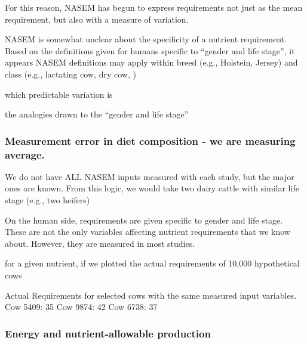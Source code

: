 \documentclass[
]{book}
\begin{document}
For this reason, NASEM \citeyearpar{NASEM8} has begun to express requirements not just as the mean requirement, but also with a measure of variation.

NASEM \citeyearpar{NASEM8} is somewhat unclear about the specificity of a nutrient requirement. Based on the definitions given for humans specific to ``gender and life stage'', it appears NASEM definitions may apply within breed (e.g., Holstein, Jersey) and class (e.g., lactating cow, dry cow, )

which predictable variation is

the analogies drawn to the ``gender and life stage''

\hypertarget{measurement-error-in-diet-composition---we-are-measuring-average.}{%
\subsubsection{Measurement error in diet composition - we are measuring average.}\label{measurement-error-in-diet-composition---we-are-measuring-average.}}

We do not have ALL NASEM inputs measured with each study, but the major ones are known. From this logic, we would take two dairy cattle with similar life stage (e.g., two heifers)

On the human side, requirements are given specific to gender and life stage. These are not the only variables affecting nutrient requirements that we know about. However, they are measured in most studies.

for a given nutrient, if we plotted the actual requirements of 10,000 hypothetical cows

Actual Requirements for selected cows with the same measured input variables.
Cow 5409: 35
Cow 9874: 42
Cow 6738: 37

\hypertarget{energy-and-nutrient-allowable-production}{%
\subsubsection{Energy and nutrient-allowable production}\label{energy-and-nutrient-allowable-production}}

  
\end{document}
